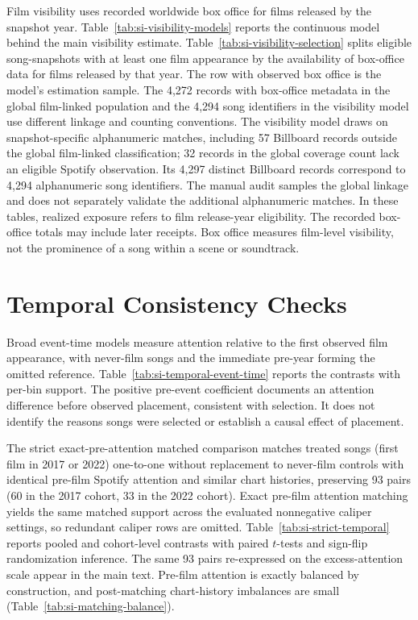 \documentclass[11pt]{article}
\begin{document}
{\sloppy Film visibility uses recorded worldwide box office for films released by the snapshot year. Table~\ref{tab:si-visibility-models} reports the continuous model behind the main visibility estimate. Table~\ref{tab:si-visibility-selection} splits eligible song-snapshots with at least one film appearance by the availability of box-office data for films released by that year. The row with observed box office is the model's estimation sample. The 4,272 records with box-office metadata in the global film-linked population and the 4,294 song identifiers in the visibility model use different linkage and counting conventions. The visibility model draws on snapshot-specific alphanumeric matches, including 57 Billboard records outside the global film-linked classification; 32 records in the global coverage count lack an eligible Spotify observation. Its 4,297 distinct Billboard records correspond to 4,294 alphanumeric song identifiers. The manual audit samples the global linkage and does not separately validate the additional alphanumeric matches. In these tables, realized exposure refers to film release-year eligibility. The recorded box-office totals may include later receipts. Box office measures film-level visibility, not the prominence of a song within a scene or soundtrack.\par}





\section*{Temporal Consistency Checks}

Broad event-time models measure attention relative to the first observed film appearance, with never-film songs and the immediate pre-year forming the omitted reference. Table~\ref{tab:si-temporal-event-time} reports the contrasts with per-bin support. The positive pre-event coefficient documents an attention difference before observed placement, consistent with selection. It does not identify the reasons songs were selected or establish a causal effect of placement.



The strict exact-pre-attention matched comparison matches treated songs (first film in 2017 or 2022) one-to-one without replacement to never-film controls with identical pre-film Spotify attention and similar chart histories, preserving 93 pairs (60 in the 2017 cohort, 33 in the 2022 cohort). Exact pre-film attention matching yields the same matched support across the evaluated nonnegative caliper settings, so redundant caliper rows are omitted. Table~\ref{tab:si-strict-temporal} reports pooled and cohort-level contrasts with paired $t$-tests and sign-flip randomization inference. The same 93 pairs re-expressed on the excess-attention scale appear in the main text. Pre-film attention is exactly balanced by construction, and post-matching chart-history imbalances are small (Table~\ref{tab:si-matching-balance}).
\end{document}
